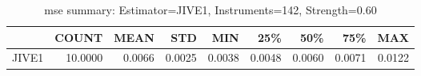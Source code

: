 \begin{table}[ht]
\centering
\caption{mse summary: Estimator=JIVE1, Instruments=142, Strength=0.60}
\begin{tabular}{lrrrrrrrr}
\toprule
 & COUNT & MEAN & STD & MIN & 25\% & 50\% & 75\% & MAX \\
\midrule
JIVE1 & 10.0000 & 0.0066 & 0.0025 & 0.0038 & 0.0048 & 0.0060 & 0.0071 & 0.0122 \\
\bottomrule
\end{tabular}
\end{table}
